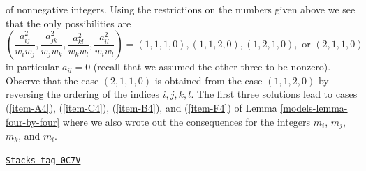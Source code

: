 of nonnegative integers. Using the restrictions on the numbers given above
we see that the only possibilities are
$$
(\frac{a_{ij}^2}{w_iw_j}, \frac{a_{jk}^2}{w_jw_k}, \frac{a_{kl}^2}{w_kw_l},
\frac{a_{il}^2}{w_iw_l}) =
(1, 1, 1, 0), (1, 1, 2, 0), (1, 2, 1, 0), \text{ or }(2, 1, 1, 0)
$$
in particular $a_{il} = 0$ (recall that we assumed the other three
to be nonzero). Observe that the case $(2, 1, 1, 0)$ is obtained
from the case $(1, 1, 2, 0)$ by reversing the ordering
of the indices $i, j, k, l$. The first three solutions lead
to cases (\ref{item-A4}), (\ref{item-C4}), (\ref{item-B4}), and
(\ref{item-F4}) of Lemma \ref{models-lemma-four-by-four}
where we also wrote out the consequences for the integers $m_i$, $m_j$, $m_k$,
and $m_l$.

\begin{lemma}
\label{models-lemma-four-by-four}
\href{https://stacks.math.columbia.edu/tag/0C7V}{\texttt{Stacks tag 0C7V}}


\end{lemma}
